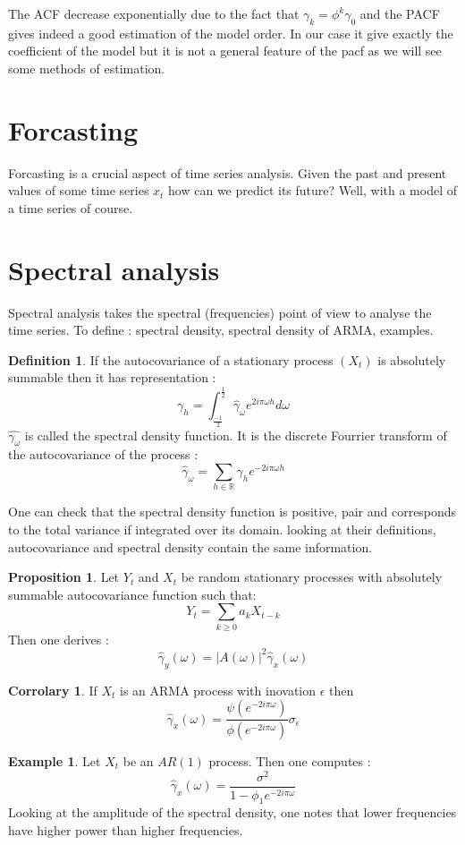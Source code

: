 \documentclass{article}
\theoremstyle{definition}
\newtheorem{Prop}{Proposition}[section]
\newtheorem{ex}{Example}[section]
\newtheorem{Def}{Definition}[section]
\newtheorem{Cor}{Corrolary}[section]
\begin{document}
The ACF decrease exponentially due to the fact that $\gamma_k=\phi^k\gamma_0$ and the PACF gives indeed a good estimation of the model order. In our case it give exactly the coefficient of the model but it is not a general feature of the pacf as we will see some methods of estimation.
\section{Forcasting}
Forcasting is a crucial aspect of time series analysis. Given the past and present values of some time series $x_t$ how can we predict its future? Well, with a model of a time series of course.
\section{Spectral analysis}
Spectral analysis takes the spectral (frequencies) point of view to analyse the time series. To define : spectral density, spectral density of ARMA, examples.
\begin{Def}
If the autocovariance of a stationary process $(X_t)$ is absolutely summable then it has representation : \begin{equation*}
    \gamma_h=\int_{\frac{-1}{2}}^{\frac{1}{2}}\hat{\gamma}_{\omega}e^{2i\pi\omega h}d\omega
\end{equation*} 
$\hat{\gamma_{\omega}}$ is called the spectral density function. It is the discrete Fourrier transform of the autocovariance of the process : 
\begin{equation*}
    \hat{\gamma}_{\omega}=\sum_{h\in\mathbb{R}}\gamma_he^{-2i\pi\omega h}
\end{equation*}
\end{Def}
One can check that the spectral density function is positive, pair and corresponds to the total variance if integrated over its domain. looking at their definitions, autocovariance and spectral density contain the same information.
\begin{Prop}
Let $Y_t$ and $X_t$ be random stationary processes with absolutely summable autocovariance function such that: 
\begin{equation*}
    Y_t=\sum_{k\geq 0} a_kX_{t-k}
\end{equation*}
Then one derives :
\begin{equation*}
    \hat{\gamma}_y(\omega)=|A(\omega)|^2\hat{\gamma}_x(\omega)
\end{equation*}
\end{Prop}
\begin{Cor}
If $X_t$ is an ARMA process with inovation $\epsilon$ then \begin{equation*}
    \hat{\gamma}_x(\omega)=\frac{\psi(e^{-2i\pi\omega})}{\phi(e^{-2i\pi\omega})}\sigma_{\epsilon}
\end{equation*}
\end{Cor}
\begin{ex}
Let $X_t$ be an $AR(1)$ process. Then one computes : 
\begin{equation*}
    \hat{\gamma}_x(\omega)=\frac{\sigma^2}{1-\phi_1 e^{-2i\pi\omega}}
\end{equation*}
Looking at the amplitude of the spectral density, one notes that lower frequencies have higher power than higher frequencies. \end{ex}
\end{document}
